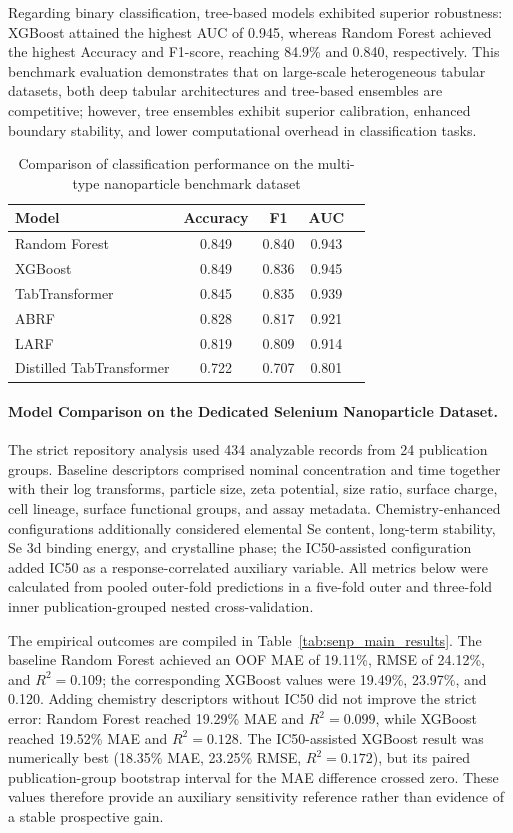 Regarding binary classification, tree-based models exhibited superior robustness: XGBoost attained the highest AUC of 0.945, whereas Random Forest achieved the highest Accuracy and F1-score, reaching 84.9\% and 0.840, respectively. This benchmark evaluation demonstrates that on large-scale heterogeneous tabular datasets, both deep tabular architectures and tree-based ensembles are competitive; however, tree ensembles exhibit superior calibration, enhanced boundary stability, and lower computational overhead in classification tasks.

\begin{table}[htbp]
  \centering
  \caption{Comparison of classification performance on the multi-type nanoparticle benchmark dataset}
  \label{tab:benchmark_classification}
  \begin{tabular}{lcccc}
    \hline
    Model & Accuracy & F1 & AUC \\
    \hline
    Random Forest & 0.849 & 0.840 & 0.943 \\
    XGBoost & 0.849 & 0.836 & 0.945 \\
    TabTransformer & 0.845 & 0.835 & 0.939 \\
    ABRF & 0.828 & 0.817 & 0.921 \\
    LARF & 0.819 & 0.809 & 0.914 \\
    Distilled TabTransformer & 0.722 & 0.707 & 0.801 \\
    \hline
  \end{tabular}
\end{table}

\paragraph{Model Comparison on the Dedicated Selenium Nanoparticle Dataset.}
The strict repository analysis used 434 analyzable records from 24 publication groups. Baseline descriptors comprised nominal concentration and time together with their log transforms, particle size, zeta potential, size ratio, surface charge, cell lineage, surface functional groups, and assay metadata. Chemistry-enhanced configurations additionally considered elemental Se content, long-term stability, Se 3d binding energy, and crystalline phase; the IC50-assisted configuration added IC50 as a response-correlated auxiliary variable. All metrics below were calculated from pooled outer-fold predictions in a five-fold outer and three-fold inner publication-grouped nested cross-validation.

The empirical outcomes are compiled in Table~\ref{tab:senp_main_results}. The baseline Random Forest achieved an OOF MAE of 19.11\%, RMSE of 24.12\%, and $R^2=0.109$; the corresponding XGBoost values were 19.49\%, 23.97\%, and 0.120. Adding chemistry descriptors without IC50 did not improve the strict error: Random Forest reached 19.29\% MAE and $R^2=0.099$, while XGBoost reached 19.52\% MAE and $R^2=0.128$. The IC50-assisted XGBoost result was numerically best (18.35\% MAE, 23.25\% RMSE, $R^2=0.172$), but its paired publication-group bootstrap interval for the MAE difference crossed zero. These values therefore provide an auxiliary sensitivity reference rather than evidence of a stable prospective gain.

